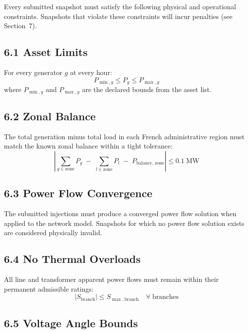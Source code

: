 \documentclass[11pt,a4paper]{article}
\begin{document}
Every submitted snapshot must satisfy the following physical and operational constraints. Snapshots that violate these constraints will incur penalties (see Section~7).

\subsection{6.1 Asset Limits}

For every generator $g$ at every hour:
%
\begin{equation}
  P_{\min,g} \leq P_g \leq P_{\max,g}
\end{equation}
%
where $P_{\min,g}$ and $P_{\max,g}$ are the declared bounds from the asset list.

\subsection{6.2 Zonal Balance}

The total generation minus total load in each French administrative region must match the known zonal balance within a tight tolerance:
%
\begin{equation}
  \left| \sum_{g \in \text{zone}} P_g \;-\; \sum_{l \in \text{zone}} P_l \;-\; P_{\text{balance, zone}} \right| \leq 0.1 \;\text{MW}
\end{equation}

\subsection{6.3 Power Flow Convergence}

The submitted injections must produce a converged power flow solution when applied to the network model. Snapshots for which no power flow solution exists are considered physically invalid.

\subsection{6.4 No Thermal Overloads}

All line and transformer apparent power flows must remain within their permanent admissible ratings:
%
\begin{equation}
  |S_{\text{branch}}| \leq S_{\max,\text{branch}} \quad \forall \; \text{branches}
\end{equation}

\subsection{6.5 Voltage Angle Bounds}
\end{document}
